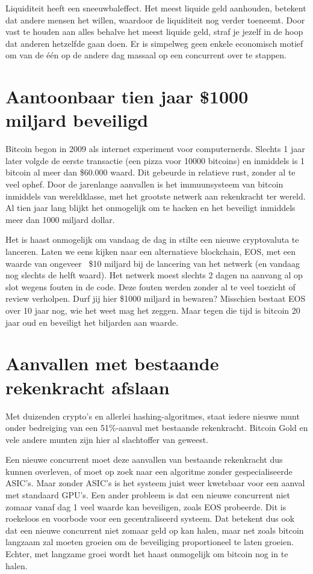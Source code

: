 Liquiditeit heeft een sneeuwbaleffect. Het meest liquide geld aanhouden, betekent dat andere mensen het willen, waardoor de liquiditeit nog verder toeneemt. Door vast te houden aan alles behalve het meest liquide geld, straf je jezelf in de hoop dat anderen hetzelfde gaan doen. Er is simpelweg geen enkele economisch motief om van de één op de andere dag massaal op een concurrent over te stappen.

\section{Aantoonbaar tien jaar \$1000 miljard beveiligd}

Bitcoin begon in 2009 als internet experiment voor computernerds. Slechts 1 jaar later volgde de eerste transactie (een pizza voor 10000 bitcoins) en inmiddels is 1 bitcoin al meer dan \$60.000 waard. Dit gebeurde in relatieve rust, zonder al te veel ophef. Door de jarenlange aanvallen is het immuunsysteem van bitcoin inmiddels van wereldklasse, met het grootste netwerk aan rekenkracht ter wereld. Al tien jaar lang blijkt het onmogelijk om te hacken en het beveiligt inmiddels meer dan 1000 miljard dollar.

Het is haast onmogelijk om vandaag de dag in stilte een nieuwe cryptovaluta te lanceren. Laten we eens kijken naar een alternatieve blockchain, EOS, met een waarde van ongeveer ~\$10 miljard bij de lancering van het netwerk (en vandaag nog slechts de helft waard). Het netwerk moest slechts 2 dagen na aanvang al op slot wegens fouten in de code. Deze fouten werden zonder al te veel toezicht of review verholpen. Durf jij hier \$1000 miljard in bewaren? Misschien bestaat EOS over 10 jaar nog, wie het weet mag het zeggen. Maar tegen die tijd is bitcoin 20 jaar oud en beveiligt het biljarden aan waarde.  

\section{Aanvallen met bestaande rekenkracht afslaan}

Met duizenden crypto's en allerlei hashing-algoritmes, staat iedere nieuwe munt onder bedreiging van een 51\%-aanval met bestaande rekenkracht. Bitcoin Gold en vele andere munten zijn hier al slachtoffer van geweest.

Een nieuwe concurrent moet deze aanvallen van bestaande rekenkracht dus kunnen overleven, of moet op zoek naar een algoritme zonder gespecialiseerde ASIC's. Maar zonder ASIC's is het systeem juist weer kwetsbaar voor een aanval met standaard GPU's. Een ander probleem is dat een nieuwe concurrent niet zomaar vanaf dag 1 veel waarde kan beveiligen, zoals EOS probeerde. Dit is roekeloos en voorbode voor een gecentraliseerd systeem. Dat betekent dus ook dat een nieuwe concurrent niet zomaar geld op kan halen, maar net zoals bitcoin langzaam zal moeten groeien om de beveiliging proportioneel te laten groeien. Echter, met langzame groei wordt het haast onmogelijk om bitcoin nog in te halen. 

